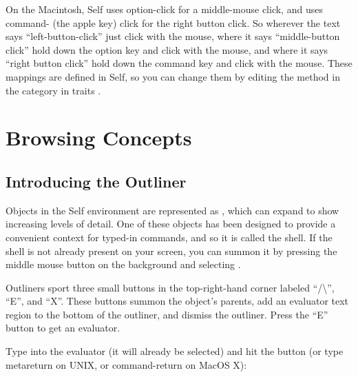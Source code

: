 \documentclass[letterpaper,10pt,english]{sphinxmanual}
\begin{document}
On the Macintosh, Self uses option-click for a middle-mouse click, and uses command- (the apple
key) click for the right button click. So wherever the text says “left-button-click” just click with the
mouse, where it says “middle-button click” hold down the option key and click with the mouse,
and where it says “right button click” hold down the command key and click with the mouse.
These mappings are defined in Self, so you can change them by editing the  method in the 
category in traits .


\section{Browsing Concepts}
\label{\detokenize{howtoprg:browsing-concepts}}

\subsection{Introducing the Outliner}
\label{\detokenize{howtoprg:introducing-the-outliner}}
Objects in the Self environment are represented as , which can expand to show increasing
levels of detail. One of these objects has been designed to provide a convenient context
for typed-in commands, and so it is called the shell. If the shell is not already present on your
screen, you can summon it by pressing the middle mouse button on the background and selecting
.
\begin{figure}[htbp]
\centering

\noindent{}
\end{figure}

Outliners sport three small buttons in the top-right-hand corner labeled “/\textbackslash{}”, “E”,
and “X”. These buttons summon the object’s parents, add an evaluator text region to the bottom of
the outliner, and dismiss the outliner. Press the “E” button to get an evaluator.

Type  into the evaluator (it will already be selected) and hit the  button
(or type metareturn on UNIX, or command-return on MacOS X):
\begin{figure}[htbp]
\centering

\noindent{}
\end{figure}
\end{document}
